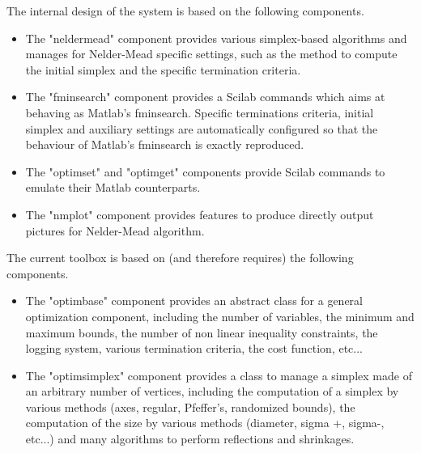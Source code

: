 The internal design of the system is based on the following components.
\begin{itemize}
\item The "neldermead" component provides various simplex-based 
algorithms and manages for Nelder-Mead specific settings, such as the 
method to compute the initial simplex and the specific termination 
criteria.
\item The "fminsearch" component provides a Scilab commands which aims 
at behaving as Matlab's fminsearch. Specific terminations criteria, 
initial simplex and auxiliary settings are automatically configured so 
that the behaviour of Matlab's fminsearch is exactly reproduced.
\item The "optimset" and "optimget" components provide Scilab commands 
to emulate their Matlab counterparts.
\item The "nmplot" component provides features to 
produce directly output pictures for Nelder-Mead algorithm.
\end{itemize}
The current toolbox is based on (and therefore requires) the following components.
\begin{itemize}
\item The "optimbase" component provides an abstract class for a general optimization 
component, including the number of variables, the minimum and maximum 
bounds, the number of non linear inequality constraints, the logging 
system, various termination criteria, the cost function, etc...
\item The "optimsimplex" component provides a class to manage a simplex made of an 
arbitrary number of vertices, including the computation of a simplex by 
various methods (axes, regular, Pfeffer's, randomized bounds), the 
computation of the size by various methods (diameter, sigma +, sigma-, 
etc...) and many algorithms to perform reflections and shrinkages.
\end{itemize}

